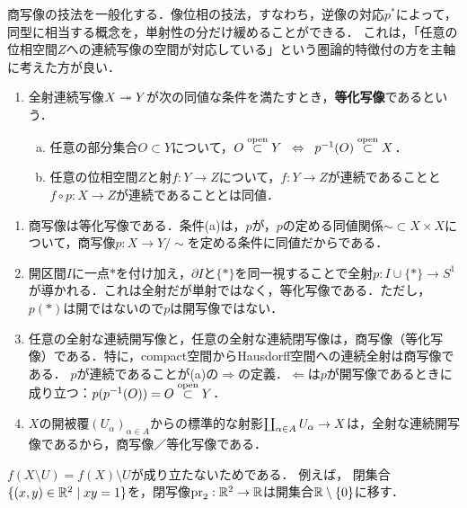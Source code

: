 \documentclass[uplatex,dvipdfmx]{jsreport}
\begin{document}
\begin{definition}
    商写像の技法を一般化する．像位相の技法，すなわち，逆像の対応$p^*$によって，同型に相当する概念を，単射性の分だけ緩めることができる．
    これは，「任意の位相空間$Z$への連続写像の空間が対応している」という圏論的特徴付の方を主軸に考えた方が良い．
    \begin{enumerate}
        \item 全射連続写像$X\twoheadrightarrow Y$が次の同値な条件を満たすとき，\textbf{等化写像}であるという．
        \begin{enumerate}[(a)]
            \item 任意の部分集合$O\subset Y$について，$O\overset{\mathrm{open}}{\subset} Y\;\;\Leftrightarrow\;\; p^{-1}(O)\overset{\mathrm{open}}{\subset} X$．
            \item 任意の位相空間$Z$と射$f:Y\to Z$について，$f:Y\to Z$が連続であることと$f\circ p:X\to Z$が連続であることとは同値．
        \end{enumerate}
    \end{enumerate}
\end{definition}
\begin{example}\mbox{}
    \begin{enumerate}
        \item 商写像は等化写像である．条件(a)は，$p$が，$p$の定める同値関係$\sim\subset X\times X$について，商写像$p:X\to Y/\sim$を定める条件に同値だからである．
        \item 開区間$I$に一点$*$を付け加え，$\partial I$と$\{*\}$を同一視することで全射$p:I\cup\{*\}\to S^1$が導かれる．これは全射だが単射ではなく，等化写像である．ただし，$p(*)$は開ではないので$p$は開写像ではない．
        \item 任意の全射な連続開写像と，任意の全射な連続閉写像は，商写像（等化写像）である．特に，compact空間からHausdorff空間への連続全射は商写像である．
        $p$が連続であることが(a)の$\Rightarrow$の定義．$\Leftarrow$は$p$が開写像であるときに成り立つ：$p(p^{-1}(O))=O\overset{\mathrm{open}}{\subset} Y$．
        \item $X$の開被覆$(U_{\alpha})_{\alpha\in A}$からの標準的な射影$\coprod_{\alpha\in A}U_\alpha\to X$は，全射な連続開写像であるから，商写像／等化写像である．
    \end{enumerate}
\end{example}
\begin{remark}[開写像は閉写像とは限らない]
    $f(X\setminus U)=f(X)\setminus U$が成り立たないためである．
    例えば，
    閉集合$\{(x,y)\in\mathbb{R}^2\mid xy=1\}$を，閉写像$\mathrm{pr}_2:\mathbb{R}^2\to\mathbb{R}$は開集合$\mathbb{R}\setminus\{0\}$に移す．
\end{remark}
\end{document}
